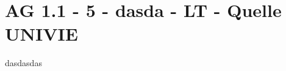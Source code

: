 \section{AG 1.1 - 5 - dasda - LT - Quelle UNIVIE}

\begin{beispiel}[AG 1.1]{1}
dasdasdas
\end{beispiel}